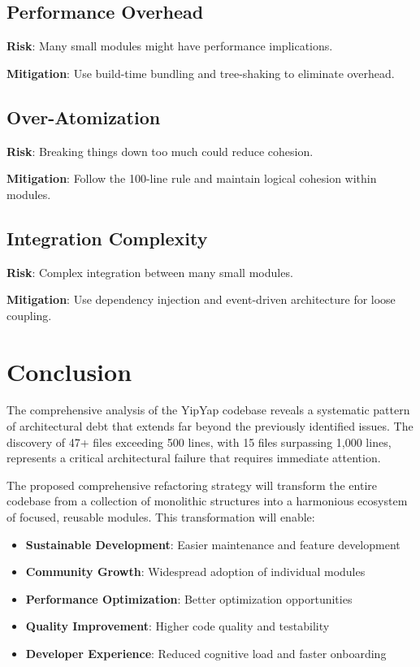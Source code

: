 \documentclass[11pt]{article}
\begin{document}
\subsection{Performance Overhead}

\textbf{Risk}: Many small modules might have performance implications.

\textbf{Mitigation}: Use build-time bundling and tree-shaking to eliminate overhead.

\subsection{Over-Atomization}

\textbf{Risk}: Breaking things down too much could reduce cohesion.

\textbf{Mitigation}: Follow the 100-line rule and maintain logical cohesion within modules.

\subsection{Integration Complexity}

\textbf{Risk}: Complex integration between many small modules.

\textbf{Mitigation}: Use dependency injection and event-driven architecture for loose coupling.

\section{Conclusion}

The comprehensive analysis of the YipYap codebase reveals a systematic pattern of architectural debt that extends far beyond the previously identified issues. The discovery of 47+ files exceeding 500 lines, with 15 files surpassing 1,000 lines, represents a critical architectural failure that requires immediate attention.

The proposed comprehensive refactoring strategy will transform the entire codebase from a collection of monolithic structures into a harmonious ecosystem of focused, reusable modules. This transformation will enable:

\begin{itemize}
\item \textbf{Sustainable Development}: Easier maintenance and feature development
\item \textbf{Community Growth}: Widespread adoption of individual modules
\item \textbf{Performance Optimization}: Better optimization opportunities
\item \textbf{Quality Improvement}: Higher code quality and testability
\item \textbf{Developer Experience}: Reduced cognitive load and faster onboarding
\end{itemize}
\end{document}
